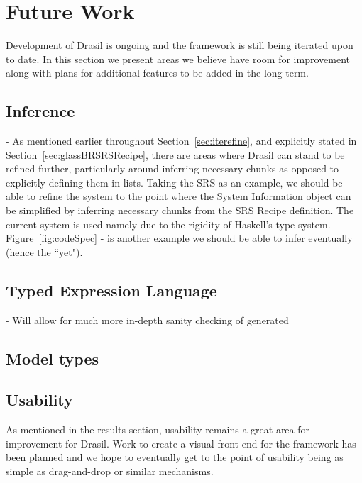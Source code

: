\chapter{Future Work}
\label{c:future}

Development of Drasil is ongoing and the framework is still being iterated upon
to date. In this section we present areas we believe have room for improvement
along with plans for additional features to be added in the long-term.

\section{Inference}

- As mentioned earlier throughout Section~\ref{sec:iterefine}, and explicitly 
stated in Section~\ref{sec:glassBRSRSRecipe}, there are areas where Drasil can
stand to be refined further, particularly around inferring necessary chunks as 
opposed to explicitly defining them in lists. Taking the SRS as an example, we 
should be able to refine the system to the point where the System Information 
object can be simplified by inferring necessary chunks from the SRS Recipe 
definition. The current system is used namely due to the rigidity of Haskell's 
type system.
Figure~\ref{fig:codeSpec} -  is another example we should be 
able to infer eventually (hence the ``yet").

\section{Typed Expression Language}
- Will allow for much more in-depth sanity checking of generated \sfs{}

\section{Model types}

\section{Usability}
As mentioned in the results section, usability remains a great area for
improvement for Drasil. Work to create a visual front-end for the framework
has been planned and we hope to eventually get to the point of usability being
as simple as drag-and-drop or similar mechanisms.

